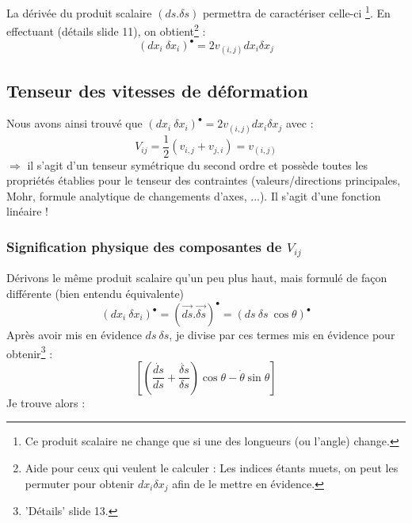          La dérivée du produit scalaire $(ds.\delta s)$ permettra de caractériser celle-ci
         \footnote{Ce produit scalaire ne change que si une des longueurs (ou l'angle) change.}. En
         effectuant (détails slide 11), on obtient\footnote{Aide pour ceux qui veulent le calculer :
         Les indices étants muets, on peut les permuter pour obtenir $dx_i\delta x_j$ afin de le
         mettre en évidence.} :
         \begin{equation}
         (dx_i\ \delta x_i)^\bullet = 2v_{(i,j)} dx_i\delta x_j
         \end{equation}
         
         
    \subsection{Tenseur des vitesses de déformation}
    Nous avons ainsi trouvé que $(dx_i\ \delta x_i)^\bullet = 2v_{(i,j)} dx_i\delta x_j$ avec :
    \begin{equation}
    V_{ij} = \frac{1}{2}(v_{i,j} + v_{j,i}) = v_{(i,j)}
    \end{equation}
    $\Rightarrow$ il s'agit d'un tenseur symétrique du second ordre et possède toutes les propriétés
    établies pour le tenseur des contraintes (valeurs/directions principales, Mohr, formule analytique
    de changements d'axes, ...). Il s'agit d'une fonction linéaire !
    
    
        \subsubsection{Signification physique des composantes de $V_{ij}$}
        Dérivons le même produit scalaire qu'un peu plus haut, mais formulé de façon différente (bien
        entendu équivalente)
        \begin{equation}
        (dx_i\ \delta x_i)^\bullet = (\vec{ds}.\vec{\delta s})^\bullet = (ds\ \delta s \ \cos
        \theta)^\bullet
        \end{equation}
        Après avoir mis en évidence $ds\ \delta s$, je divise par ces termes mis en évidence pour 
        obtenir\footnote{'Détails' slide 13.} :
        \begin{equation}
        \left[\left( \dfrac{\dot{ds}}{ds}+\dfrac{\dot{\delta s}}{\delta s}\right)\cos\theta - \dot{
        \theta}\sin\theta\right]
        \end{equation}
        Je trouve alors :\\
        
